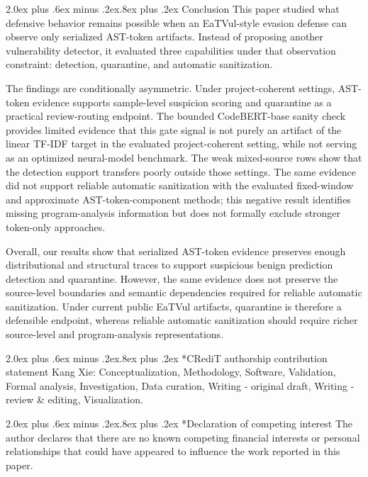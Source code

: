 \documentclass[letterpaper,twocolumn,10pt,twoside]{article}
\makeatletter
\renewcommand\section{\@startsection{section}{1}{\z@}%
  {2.0ex plus .6ex minus .2ex}{.8ex plus .2ex}%
  {\normalfont\large\bfseries}}
\makeatother
\begin{document}
\section{Conclusion}
This paper studied what defensive behavior remains possible when an EaTVul-style evasion defense can observe only serialized AST-token artifacts. Instead of proposing another vulnerability detector, it evaluated three capabilities under that observation constraint: detection, quarantine, and automatic sanitization.

The findings are conditionally asymmetric. Under project-coherent settings, AST-token evidence supports sample-level suspicion scoring and quarantine as a practical review-routing endpoint. The bounded CodeBERT-base sanity check provides limited evidence that this gate signal is not purely an artifact of the linear TF-IDF target in the evaluated project-coherent setting, while not serving as an optimized neural-model benchmark. The weak mixed-source rows show that the detection support transfers poorly outside those settings. The same evidence did not support reliable automatic sanitization with the evaluated fixed-window and approximate AST-token-component methods; this negative result identifies missing program-analysis information but does not formally exclude stronger token-only approaches.

Overall, our results show that serialized AST-token evidence preserves enough distributional and structural traces to support suspicious benign prediction detection and quarantine. However, the same evidence does not preserve the source-level boundaries and semantic dependencies required for reliable automatic sanitization. Under current public EaTVul artifacts, quarantine is therefore a defensible endpoint, whereas reliable automatic sanitization should require richer source-level and program-analysis representations.

\section*{CRediT authorship contribution statement}
Kang Xie: Conceptualization, Methodology, Software, Validation, Formal analysis, Investigation, Data curation, Writing - original draft, Writing - review \& editing, Visualization.

\section*{Declaration of competing interest}
The author declares that there are no known competing financial interests or personal relationships that could have appeared to influence the work reported in this paper.
\end{document}
